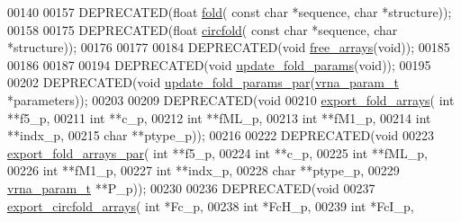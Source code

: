 \begin{DoxyCode}
00140 
00157 DEPRECATED(\textcolor{keywordtype}{float} \hyperlink{group__mfe__fold__single_gaadafcb0f140795ae62e5ca027e335a9b}{fold}( \textcolor{keyword}{const} \textcolor{keywordtype}{char} *sequence, \textcolor{keywordtype}{char} *structure));
00158 
00175 DEPRECATED(\textcolor{keywordtype}{float} \hyperlink{group__mfe__fold__single_ga4ac63ab3e8d9a80ced28b8052d94e423}{circfold}( \textcolor{keyword}{const} \textcolor{keywordtype}{char} *sequence, \textcolor{keywordtype}{char} *structure));
00176 
00177 
00184 DEPRECATED(\textcolor{keywordtype}{void} \hyperlink{group__mfe__fold__single_ga107fdfe5fd641868156bfd849f6866c7}{free\_arrays}(\textcolor{keywordtype}{void}));
00185 
00186 
00187 
00194 DEPRECATED(\textcolor{keywordtype}{void} \hyperlink{group__mfe__fold__single_ga41bf8f6fa15b94471f7095cad9f0ccf3}{update\_fold\_params}(\textcolor{keywordtype}{void}));
00195 
00202 DEPRECATED(\textcolor{keywordtype}{void} \hyperlink{group__mfe__fold__single_gae66dc422efb8f5d56717d92d6002a9f8}{update\_fold\_params\_par}(\hyperlink{group__energy__parameters_structvrna__param__s}{vrna\_param\_t} *parameters));
00203 
00209 DEPRECATED(\textcolor{keywordtype}{void}
00210 \hyperlink{group__mfe__fold__single_ga99641b8dbb40891da5490d3cc271e607}{export\_fold\_arrays}( \textcolor{keywordtype}{int} **f5\_p,
00211                     \textcolor{keywordtype}{int} **c\_p,
00212                     \textcolor{keywordtype}{int} **fML\_p,
00213                     \textcolor{keywordtype}{int} **fM1\_p,
00214                     \textcolor{keywordtype}{int} **indx\_p,
00215                     \textcolor{keywordtype}{char} **ptype\_p));
00216 
00222 DEPRECATED(\textcolor{keywordtype}{void}
00223 \hyperlink{group__mfe__fold__single_ga6606ec0ec964ea506fdadb997a1a5328}{export\_fold\_arrays\_par}( \textcolor{keywordtype}{int} **f5\_p,
00224                         \textcolor{keywordtype}{int} **c\_p,
00225                         \textcolor{keywordtype}{int} **fML\_p,
00226                         \textcolor{keywordtype}{int} **fM1\_p,
00227                         \textcolor{keywordtype}{int} **indx\_p,
00228                         \textcolor{keywordtype}{char} **ptype\_p,
00229                         \hyperlink{group__energy__parameters_structvrna__param__s}{vrna\_param\_t} **P\_p));
00230 
00236 DEPRECATED(\textcolor{keywordtype}{void}
00237 \hyperlink{group__mfe__fold__single_ga04d5d639fd4473ca766436a9bae5665c}{export\_circfold\_arrays}( \textcolor{keywordtype}{int} *Fc\_p,
00238                         \textcolor{keywordtype}{int} *FcH\_p,
00239                         \textcolor{keywordtype}{int} *FcI\_p,

\end{DoxyCode}
